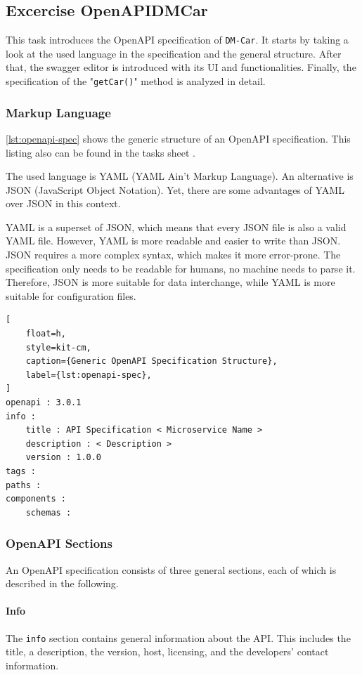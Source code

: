 \subsection{Excercise OpenAPIDMCar}
This task introduces the OpenAPI specification of \texttt{DM-Car}.
It starts by taking a look at the used language in the specification and the general structure.
After that, the swagger editor \cite{SWA-EDI} is introduced with its UI and functionalities.
Finally, the specification of the "\texttt{getCar()}" method is analyzed in detail.

\subsubsection*{Markup Language}
\autoref*{lst:openapi-spec} shows the generic structure of an OpenAPI specification.
This listing also can be found in the tasks sheet \cite{CM-T-DMC}.

The used language is YAML (YAML Ain't Markup Language).
An alternative is JSON (JavaScript Object Notation).
Yet, there are some advantages of YAML over JSON in this context.

YAML is a superset of JSON, which means that every JSON file is also a valid YAML file.
However, YAML is more readable and easier to write than JSON.
JSON requires a more complex syntax, which makes it more error-prone.
The specification only needs to be readable for humans, no machine needs to parse it.
Therefore, JSON is more suitable for data interchange, while YAML is more suitable for configuration files.

\begin{lstlisting}[
    float=h,
    style=kit-cm,
    caption={Generic OpenAPI Specification Structure},
    label={lst:openapi-spec},
]
openapi : 3.0.1
info :
    title : API Specification < Microservice Name >
    description : < Description >
    version : 1.0.0
tags :
paths :
components :
    schemas :
\end{lstlisting}

\subsubsection*{OpenAPI Sections}
An OpenAPI specification consists of three general sections, each of which is described in the following.
\paragraph*{Info}
The \texttt{info} section contains general information about the API.
This includes the title, a description, the version, host, licensing, and the developers' contact information.

